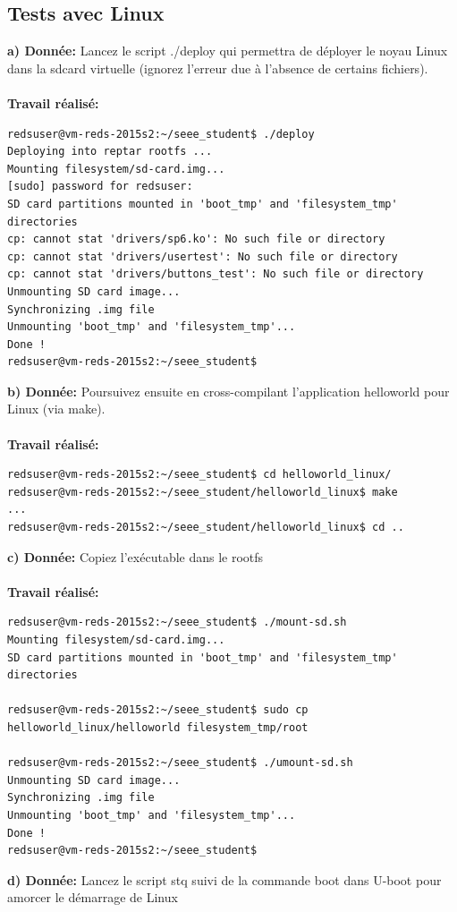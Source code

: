 \subsection{Tests avec Linux}
\textbf{a) Donnée: }Lancez le script ./deploy qui permettra de déployer le noyau Linux dans la sdcard virtuelle (ignorez
l'erreur due à l'absence de certains fichiers). \\\\
\textbf{Travail réalisé: }
\begin{lstlisting}
redsuser@vm-reds-2015s2:~/seee_student$ ./deploy 
Deploying into reptar rootfs ...
Mounting filesystem/sd-card.img...
[sudo] password for redsuser: 
SD card partitions mounted in 'boot_tmp' and 'filesystem_tmp' directories
cp: cannot stat 'drivers/sp6.ko': No such file or directory
cp: cannot stat 'drivers/usertest': No such file or directory
cp: cannot stat 'drivers/buttons_test': No such file or directory
Unmounting SD card image...
Synchronizing .img file
Unmounting 'boot_tmp' and 'filesystem_tmp'...
Done !
redsuser@vm-reds-2015s2:~/seee_student$ 
\end{lstlisting}
\textbf{b) Donnée: }Poursuivez ensuite en cross-compilant l'application helloworld pour Linux (via make). \\\\
\textbf{Travail réalisé: }
\begin{lstlisting}
redsuser@vm-reds-2015s2:~/seee_student$ cd helloworld_linux/
redsuser@vm-reds-2015s2:~/seee_student/helloworld_linux$ make
...
redsuser@vm-reds-2015s2:~/seee_student/helloworld_linux$ cd ..
\end{lstlisting}
\textbf{c) Donnée: }Copiez l'exécutable dans le rootfs\\\\
\textbf{Travail réalisé: }
\begin{lstlisting}
redsuser@vm-reds-2015s2:~/seee_student$ ./mount-sd.sh 
Mounting filesystem/sd-card.img...
SD card partitions mounted in 'boot_tmp' and 'filesystem_tmp' directories

redsuser@vm-reds-2015s2:~/seee_student$ sudo cp helloworld_linux/helloworld filesystem_tmp/root

redsuser@vm-reds-2015s2:~/seee_student$ ./umount-sd.sh 
Unmounting SD card image...
Synchronizing .img file
Unmounting 'boot_tmp' and 'filesystem_tmp'...
Done !
redsuser@vm-reds-2015s2:~/seee_student$ 
\end{lstlisting}
\textbf{d) Donnée: }Lancez le script stq suivi de la commande boot dans U-boot pour amorcer le démarrage de Linux\\\\
